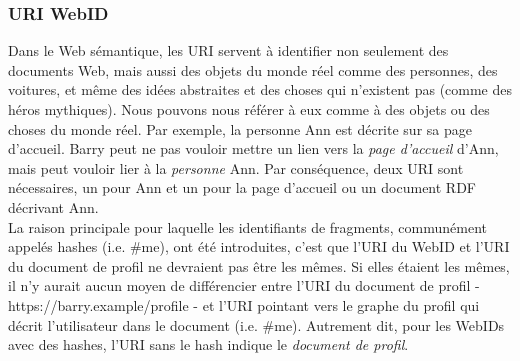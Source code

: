 \subsubsection{URI WebID}
Dans le Web sémantique, les URI servent à identifier non seulement des documents Web, mais aussi des objets du monde réel comme des personnes, des voitures, et même des idées abstraites et des choses qui n'existent pas (comme des héros mythiques). Nous pouvons nous référer à eux comme à des objets ou des choses du monde réel. Par exemple, la personne Ann est décrite sur sa page d'accueil. Barry peut ne pas vouloir mettre un lien vers la \textit{page d'accueil} d'Ann, mais peut vouloir lier à la \textit{personne} Ann. Par conséquence, deux URI sont nécessaires, un pour Ann et un pour la page d'accueil ou un document RDF décrivant Ann.\\


La raison principale pour laquelle les identifiants de fragments, communément appelés hashes (i.e. \#me), ont été introduites, c'est que l'URI du WebID et l'URI du document de profil ne devraient pas être les mêmes. Si elles étaient les mêmes, il n'y aurait aucun moyen de différencier entre l'URI du document de profil - https://barry.example/profile - et l'URI pointant vers le graphe du profil qui décrit l'utilisateur dans le document (i.e. \#me). Autrement dit, pour les WebIDs avec des hashes, l'URI sans le hash indique le \textit{document de profil}.\\

